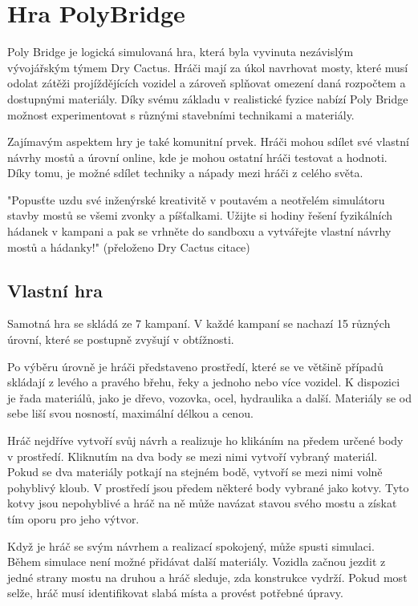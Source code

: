\chapter{Hra PolyBridge}

Poly Bridge je logická simulovaná hra, která byla vyvinuta nezávislým vývojářským týmem Dry Cactus. Hráči mají za úkol navrhovat mosty, které musí odolat zátěži projíždějících vozidel a zároveň splňovat omezení daná rozpočtem a dostupnými materiály. Díky svému základu v realistické fyzice nabízí Poly Bridge možnost experimentovat s různými stavebními technikami a materiály.

Zajímavým aspektem hry je také komunitní prvek. Hráči mohou sdílet své vlastní návrhy mostů a úrovní online, kde je mohou ostatní hráči testovat a hodnoti. Díky tomu, je možné sdílet techniky a nápady mezi hráči z celého světa. 

"Popusťte uzdu své inženýrské kreativitě v poutavém a neotřelém simulátoru stavby mostů se všemi zvonky a píšťalkami. Užijte si hodiny řešení fyzikálních hádanek v kampani a pak se vrhněte do sandboxu a vytvářejte vlastní návrhy mostů a hádanky!" (přeloženo Dry Cactus citace)

\section{Vlastní hra}

Samotná hra se skládá ze 7 kampaní. V každé kampaní se nachazí 15 různých úrovní, které se postupně zvyšují v obtížnosti.

Po výběru úrovně je hráči představeno prostředí, které se ve většině případů skládají z levého a pravého břehu, řeky a jednoho nebo více vozidel. K dispozici je řada materiálů, jako je dřevo, vozovka, ocel, hydraulika a další. Materiály se od sebe liší svou nosností, maximální délkou a cenou.

Hráč nejdříve vytvoří svůj návrh a realizuje ho klikáním na předem určené body v prostředí. Kliknutím na dva body se mezi nimi vytvoří vybraný materiál. Pokud se dva materiály potkají na stejném bodě, vytvoří se mezi nimi volně pohyblivý kloub. V prostředí jsou předem některé body vybrané jako kotvy. Tyto kotvy jsou nepohyblivé a hráč na ně může navázat stavou svého mostu a získat tím oporu pro jeho výtvor.

Když je hráč se svým návrhem a realizací spokojený, může spusti simulaci. Během simulace není možné přidávat další materiály. Vozidla začnou jezdit z jedné strany mostu na druhou a hráč sleduje, zda konstrukce vydrží. Pokud most selže, hráč musí identifikovat slabá místa a provést potřebné úpravy.

